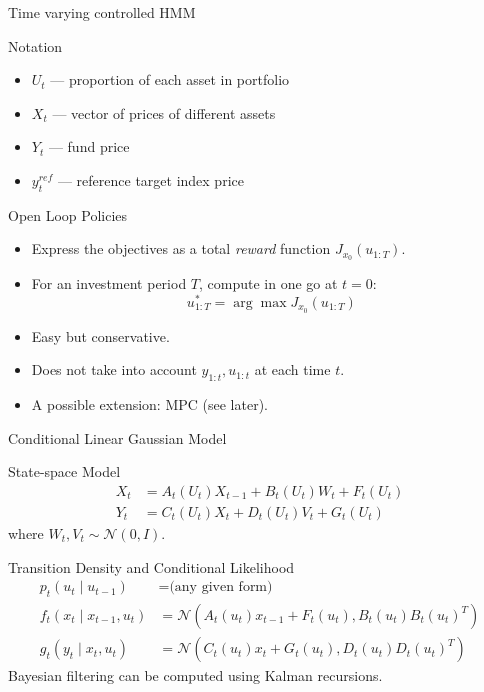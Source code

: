\documentclass[handout]{beamer}
\begin{document}
\begin{frame}{Time varying controlled HMM}
\begin{block}{Notation}
\begin{itemize}
\item $U_t$  --- proportion of each asset in portfolio
\item $X_t$ --- vector of prices of different assets
\item $Y_t$ --- fund price
\item $y^{ref}_t$ --- reference target index price
\end{itemize}
\end{block}
\begin{block}{Open Loop Policies}
\begin{itemize}
\item Express the objectives as a total \emph{reward} function $J_{x_0}(u_{1:T})$.
\item For an investment period $T$,  compute in one go at $t=0$:
 \small \begin{equation*}
      u^*_{1:T} = \arg\max J_{x_0}(u_{1:T})
   \end{equation*}\normalsize
\item Easy but conservative.
\item Does not take into account $y_{1:t}, u_{1:t}$ at each time $t$.
\item A possible extension: MPC (see later).
\end{itemize}
\end{block}
\end{frame}

\begin{frame}{Conditional Linear Gaussian Model}
\begin{block}{State-space Model}
\begin{align*}
  X_t &= A_t(U_t)X_{t-1} + B_t(U_t)W_t + F_t(U_t) \nonumber \\
  Y_t &= C_t(U_t)X_t + D_t(U_t)V_t + G_t(U_t)
\label{eq:model}
\end{align*}
where $W_t, V_t \sim \mathcal{N}(0,I)$.
\end{block}
\begin{block}{Transition Density and Conditional Likelihood}
\begin{align*}  p_t(u_t \mid u_{t-1}) &= \textrm{(any given form)} \nonumber \\
  f_t(x_t \mid x_{t-1}, u_t) &= \mathcal{N}(A_t(u_t) x_{t-1} + F_t(u_t), B_t(u_t)B_t(u_t)^T) \nonumber \\
  g_t(y_t \mid x_t, u_t)    &= \mathcal{N}(C_t(u_t) x_t + G_t(u_t), D_t(u_t)D_t(u_t)^T)
\end{align*}
Bayesian filtering can be computed using Kalman recursions.
\end{block}
\end{frame}
\end{document}
